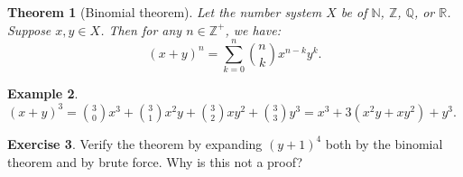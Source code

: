 \documentclass[a4paper, 10pt]{amsart}
\newtheorem{thm}{Theorem}[section]
\theoremstyle{definition}
\newtheorem{ex}[thm]{Example}
\newtheorem{exercise}[thm]{Exercise}
\theoremstyle{remark}
\begin{document}
\begin{thm}[Binomial theorem]
  Let the number system $ X $ be of $ \mathbb{N} $, $ \mathbb{Z} $, $ \mathbb{Q} $, or $ \mathbb{R} $. Suppose $ x, y \in X $. Then
  for any $ n \in \mathbb{Z}^+ $, we have:
  \begin{displaymath}
    (x + y)^n = \sum_{k = 0}^n \binom{n}{k} x^{n - k} y^k.
  \end{displaymath}
\end{thm}

\begin{ex}
  $ (x + y)^3 = \binom{3}{0} x^3 + \binom{3}{1} x^2 y + \binom{3}{2} x y^2 + \binom{3}{3} y^3 = x^3 + 3(x^2 y + xy^2) + y^3 $.
\end{ex}

\begin{exercise}
  Verify the theorem by expanding $ (y + 1)^4 $ both by the binomial theorem and by brute force. Why is this not a proof?
\end{exercise}
\end{document}
